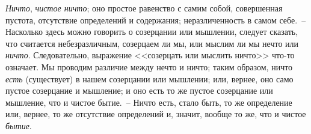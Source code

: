 \emph{Ничто}, \emph{чистое ничто}; оно простое равенство с самим
собой, совершенная пустота, отсутствие определений и
содержания; неразличенность в самом себе.~-- Насколько
здесь можно говорить о созерцании или мышлении, следует
сказать, что считается небезразличным, созерцаем
ли мы, или мыслим ли мы нечто или \emph{ничто}. Следовательно,
выражение <<созерцать или мыслить ничто>> что-то
означает. Мы проводим различие между нечто и ничто;
таким образом, ничто \emph{есть} (существует) в нашем созерцании
или мышлении; или, вернее, оно само пустое созерцание
и мышление; и оно есть то же пустое созерцание
или мышление, что и чистое бытие.~-- Ничто есть,
стало быть, то же определение или, вернее, то же отсутствие
определений и, значит, вообще то же, что и чистое
\emph{бытие}.

